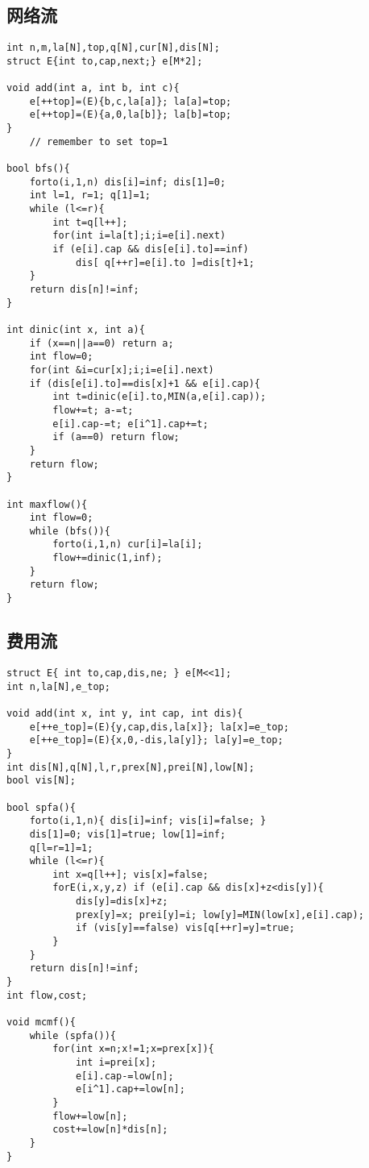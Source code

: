 \documentclass{article}
\begin{document}
\subsection{网络流}
\begin{lstlisting}
int n,m,la[N],top,q[N],cur[N],dis[N];
struct E{int to,cap,next;} e[M*2];

void add(int a, int b, int c){
	e[++top]=(E){b,c,la[a]}; la[a]=top;
	e[++top]=(E){a,0,la[b]}; la[b]=top;
}
	// remember to set top=1

bool bfs(){
	forto(i,1,n) dis[i]=inf; dis[1]=0;
	int l=1, r=1; q[1]=1;
	while (l<=r){
		int t=q[l++];
		for(int i=la[t];i;i=e[i].next)
		if (e[i].cap && dis[e[i].to]==inf)
			dis[ q[++r]=e[i].to ]=dis[t]+1;
	}
	return dis[n]!=inf;
}

int dinic(int x, int a){
	if (x==n||a==0) return a;
	int flow=0;
	for(int &i=cur[x];i;i=e[i].next)
	if (dis[e[i].to]==dis[x]+1 && e[i].cap){
		int t=dinic(e[i].to,MIN(a,e[i].cap));
		flow+=t; a-=t;
		e[i].cap-=t; e[i^1].cap+=t;
		if (a==0) return flow;
	}
	return flow;
}

int maxflow(){
	int flow=0;
	while (bfs()){
		forto(i,1,n) cur[i]=la[i];
		flow+=dinic(1,inf);
	}
	return flow;
}
\end{lstlisting}

\subsection{费用流}
\begin{lstlisting}
struct E{ int to,cap,dis,ne; } e[M<<1];
int n,la[N],e_top;

void add(int x, int y, int cap, int dis){
	e[++e_top]=(E){y,cap,dis,la[x]}; la[x]=e_top;
	e[++e_top]=(E){x,0,-dis,la[y]}; la[y]=e_top;
}
int dis[N],q[N],l,r,prex[N],prei[N],low[N];
bool vis[N];

bool spfa(){
	forto(i,1,n){ dis[i]=inf; vis[i]=false; }
	dis[1]=0; vis[1]=true; low[1]=inf;
	q[l=r=1]=1;
	while (l<=r){
		int x=q[l++]; vis[x]=false;
		forE(i,x,y,z) if (e[i].cap && dis[x]+z<dis[y]){
			dis[y]=dis[x]+z;
			prex[y]=x; prei[y]=i; low[y]=MIN(low[x],e[i].cap);
			if (vis[y]==false) vis[q[++r]=y]=true;
		}
	}
	return dis[n]!=inf;
}
int flow,cost;

void mcmf(){
	while (spfa()){
		for(int x=n;x!=1;x=prex[x]){
			int i=prei[x];
			e[i].cap-=low[n];
			e[i^1].cap+=low[n];
		}
		flow+=low[n];
		cost+=low[n]*dis[n];
	}
}
\end{lstlisting}
\end{document}
